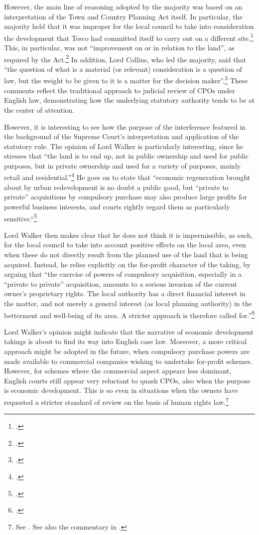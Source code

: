 {However, the main line of reasoning adopted by the majority was based on an interpretation of the Town and Country Planning Act itself. In particular, the majority held that it was improper for the local council to take into consideration the development that Tesco had committed itself to carry out on a different site.\footcite[73-79]{sainsbury10} This, in particular, was not ``improvement on or in relation to the land'', as required by the Act.\footcite[336]{tcpa90} In addition, Lord Collins, who led the majority, said that ``the question of what is a material (or relevant) consideration is a question of law, but the weight to be given to it is a matter for the decision maker''.\footcite[70]{sainsbury10} These comments reflect the traditional approach to judicial review of CPOs under English law, demonstrating how the underlying statutory authority tends to be at the center of attention.

However, it is interesting to see how the purpose of the interference featured in the background of the Supreme Court's interpretation and application of the statutory rule. The opinion of Lord Walker is particularly interesting, since he stresses that ``the land is to end up, not in public ownership and used for public purposes, but in private ownership and used for a variety of purposes, mainly retail and residential.''\footcite[81]{sainsbury10} He goes on to state that ``economic regeneration brought about by urban redevelopment is no doubt a public good, but ``private to private'' acquisitions by compulsory purchase may also produce large profits for powerful business interests, and courts rightly regard them as particularly sensitive.``\footcite[81]{sainsbury10}

Lord Walker then makes clear that he does not think it is impermissible, as such, for the local council to take into account positive effects on the local area, even when these do not directly result from the planned use of the land that is being acquired. Instead, he relies explicitly on the for-profit character of the taking, by arguing that ``the exercise of powers of compulsory acquisition, especially in a ``private to private'' acquisition, amounts to a serious invasion of the current owner's proprietary rights. The local authority has a direct financial interest in the matter, and not merely a general interest (as local planning authority) in the betterment and well-being of its area. A stricter approach is therefore called for.''\footcite[84]{sainsbury10} 

Lord Walker's opinion might indicate that the narrative of economic development takings is about to find its way into English case law. Moreover, a more critical approach might be adopted in the future, when compulsory purchase powers are made available to commercial companies wishing to undertake for-profit schemes. However, for schemes where the commercial aspect appears less dominant, English courts still appear very reluctant to quash CPOs, also when the purpose is economic development. This is so even in situations when the owners have requested a stricter standard of review on the basis of human rights law.\footnote{See \cite{smith08,alliance06}. See also the commentary in \cite[]{gray11}.} }

